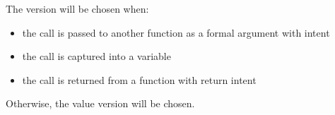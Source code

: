 The  version will be chosen when:

\begin{itemize}

\item the call is passed to another function as a formal argument with
 intent

\item the call is captured into a  variable

\item the call is returned from a function with  return intent

\end{itemize}

Otherwise, the value version will be chosen.
